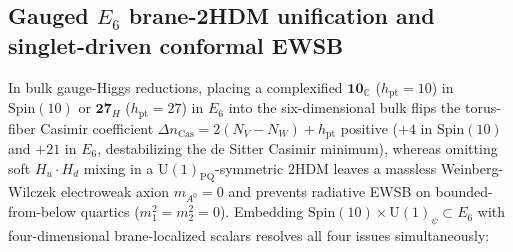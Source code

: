 \documentclass[aps,prd,twocolumn,nofootinbib,floatfix]{revtex4-2}
\begin{document}
\subsection{Gauged $E_6$ brane-2HDM unification and singlet-driven conformal EWSB}

In bulk gauge-Higgs reductions, placing a complexified $\mathbf{10}_{\mathbb{C}}$ ($h_{\mathrm{pt}} = 10$) in $\mathrm{Spin}(10)$ or $\mathbf{27}_H$ ($h_{\mathrm{pt}} = 27$) in $E_6$ into the six-dimensional bulk flips the torus-fiber Casimir coefficient $\Delta n_{\mathrm{Cas}} = 2(N_V - N_W) + h_{\mathrm{pt}}$ positive ($+4$ in $\mathrm{Spin}(10)$ and $+21$ in $E_6$, destabilizing the de Sitter Casimir minimum), whereas omitting soft $H_u\cdot H_d$ mixing in a $\mathrm{U}(1)_{\mathrm{PQ}}$-symmetric $2\mathrm{HDM}$ leaves a massless Weinberg-Wilczek electroweak axion $m_{A^0} = 0$ and prevents radiative EWSB on bounded-from-below quartics ($m_1^2 = m_2^2 = 0$).
Embedding $\mathrm{Spin}(10)\times\mathrm{U}(1)_\psi \subset E_6$ with four-dimensional brane-localized scalars resolves all four issues simultaneously:
\end{document}
